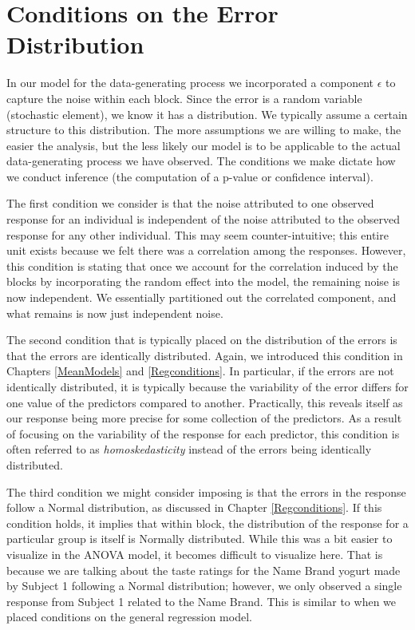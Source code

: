 \documentclass[]{book}
\theoremstyle{plain}
\theoremstyle{mydefn}
\theoremstyle{myexmpl}
\theoremstyle{remark}
\begin{document}
\section{Conditions on the Error
Distribution}\label{conditions-on-the-error-distribution-2}

In our model for the data-generating process we incorporated a component
\(\epsilon\) to capture the noise within each block. Since the error is
a random variable (stochastic element), we know it has a distribution.
We typically assume a certain structure to this distribution. The more
assumptions we are willing to make, the easier the analysis, but the
less likely our model is to be applicable to the actual data-generating
process we have observed. The conditions we make dictate how we conduct
inference (the computation of a p-value or confidence interval).

The first condition we consider is that the noise attributed to one
observed response for an individual is independent of the noise
attributed to the observed response for any other individual. This may
seem counter-intuitive; this entire unit exists because we felt there
was a correlation among the responses. However, this condition is
stating that once we account for the correlation induced by the blocks
by incorporating the random effect into the model, the remaining noise
is now independent. We essentially partitioned out the correlated
component, and what remains is now just independent noise.

The second condition that is typically placed on the distribution of the
errors is that the errors are identically distributed. Again, we
introduced this condition in Chapters \ref{MeanModels} and
\ref{Regconditions}. In particular, if the errors are not identically
distributed, it is typically because the variability of the error
differs for one value of the predictors compared to another.
Practically, this reveals itself as our response being more precise for
some collection of the predictors. As a result of focusing on the
variability of the response for each predictor, this condition is often
referred to as \emph{homoskedasticity} instead of the errors being
identically distributed.

The third condition we might consider imposing is that the errors in the
response follow a Normal distribution, as discussed in Chapter
\ref{Regconditions}. If this condition holds, it implies that within
block, the distribution of the response for a particular group is itself
is Normally distributed. While this was a bit easier to visualize in the
ANOVA model, it becomes difficult to visualize here. That is because we
are talking about the taste ratings for the Name Brand yogurt made by
Subject 1 following a Normal distribution; however, we only observed a
single response from Subject 1 related to the Name Brand. This is
similar to when we placed conditions on the general regression model.
\end{document}
